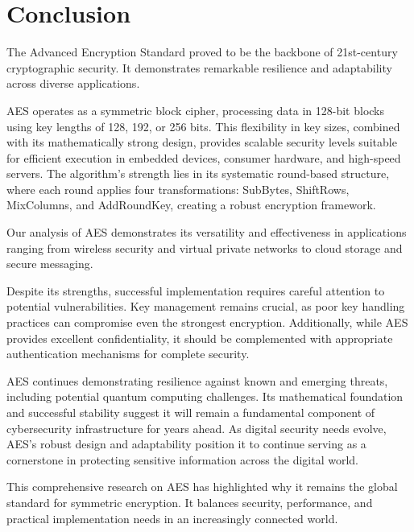 \section{Conclusion}

The Advanced Encryption Standard proved to be the backbone of 21st-century cryptographic security. It demonstrates remarkable resilience and adaptability across diverse applications.

AES operates as a symmetric block cipher, processing data in 128-bit blocks using key lengths of 128, 192, or 256 bits. This flexibility in key sizes, combined with its mathematically strong design, provides scalable security levels suitable for efficient execution in embedded devices, consumer hardware, and high-speed servers. The algorithm's strength lies in its systematic round-based structure, where each round applies four transformations: SubBytes, ShiftRows, MixColumns, and AddRoundKey, creating a robust encryption framework.

Our analysis of AES demonstrates its versatility and effectiveness in applications ranging from wireless security and virtual private networks to cloud storage and secure messaging.

Despite its strengths, successful implementation requires careful attention to potential vulnerabilities. Key management remains crucial, as poor key handling practices can compromise even the strongest encryption. Additionally, while AES provides excellent confidentiality, it should be complemented with appropriate authentication mechanisms for complete security.

AES continues demonstrating resilience against known and emerging threats, including potential quantum computing challenges. Its mathematical foundation and successful stability suggest it will remain a fundamental component of cybersecurity infrastructure for years ahead. As digital security needs evolve, AES's robust design and adaptability position it to continue serving as a cornerstone in protecting sensitive information across the digital world.

This comprehensive research on AES has highlighted why it remains the global standard for symmetric encryption. It balances security, performance, and practical implementation needs in an increasingly connected world.
